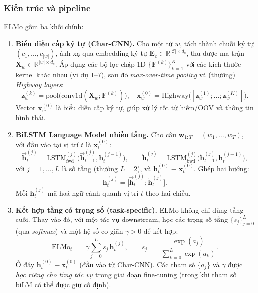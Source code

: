 \subsubsection{Kiến trúc và pipeline}
\label{ssec:elmo_architecture}

ELMo gồm ba khối chính:

\begin{enumerate}
  \item \textbf{Biểu diễn cấp ký tự (Char-CNN).}
  Cho một từ $w$, tách thành chuỗi ký tự $(c_1,\dots,c_{|w|})$, ánh xạ qua embedding ký tự $\mathbf{E}_c \in \mathbb{R}^{|\mathcal{C}|\times d_c}$, thu được ma trận $\mathbf{X}_w \in \mathbb{R}^{|w|\times d_c}$. Áp dụng các bộ lọc chập 1D $\{\mathbf{F}^{(k)}\}_{k=1}^K$ với các kích thước kernel khác nhau (ví dụ 1–7), sau đó \emph{max-over-time pooling} và (thường) \emph{Highway layers}:
  \[
    \mathbf{z}_w^{(k)} = \mathrm{pool}\big(\mathrm{conv1d}(\mathbf{X}_w; \mathbf{F}^{(k)})\big), 
    \quad
    \mathbf{x}_w^{(0)} = \mathrm{Highway}\big([\mathbf{z}_w^{(1)};\dots;\mathbf{z}_w^{(K)}]\big).
  \]
  Vector $\mathbf{x}_w^{(0)}$ là biểu diễn cấp ký tự, giúp xử lý tốt từ hiếm/OOV và thông tin hình thái.

  \item \textbf{BiLSTM Language Model nhiều tầng.}
  Cho câu $\mathbf{w}_{1:T} = (w_1,\dots,w_T)$, với đầu vào tại vị trí $t$ là $\mathbf{x}_t^{(0)}$:
  \[
    \overrightarrow{\mathbf{h}}_{t}^{(j)} = \mathrm{LSTM}^{(j)}_{\mathrm{fwd}}\big(\overrightarrow{\mathbf{h}}_{t-1}^{(j)}, \mathbf{h}_{t}^{(j-1)}\big), 
    \qquad
    \overleftarrow{\mathbf{h}}_{t}^{(j)} = \mathrm{LSTM}^{(j)}_{\mathrm{bwd}}\big(\overleftarrow{\mathbf{h}}_{t+1}^{(j)}, \mathbf{h}_{t}^{(j-1)}\big),
  \]
  với $j=1,\dots,L$ là số tầng (thường $L=2$), và $\mathbf{h}_t^{(0)}\equiv \mathbf{x}_t^{(0)}$. Ghép hai hướng:
  \[
    \mathbf{h}_t^{(j)} = \big[\overrightarrow{\mathbf{h}}_{t}^{(j)} ; \overleftarrow{\mathbf{h}}_{t}^{(j)}\big].
  \]
  Mỗi $\mathbf{h}_t^{(j)}$ mã hoá ngữ cảnh quanh vị trí $t$ theo hai chiều.

  \item \textbf{Kết hợp tầng có trọng số (task-specific).}
  ELMo không chỉ dùng tầng cuối. Thay vào đó, với một tác vụ downstream, học các trọng số tầng $\{s_j\}_{j=0}^{L}$ (qua \emph{softmax}) và một hệ số co giãn $\gamma>0$ để kết hợp:
  \[
    \text{ELMo}_t \;=\; \gamma \sum_{j=0}^{L} s_j\, \mathbf{h}_t^{(j)}, 
    \qquad 
    s_j \;=\; \frac{\exp(a_j)}{\sum_{k=0}^{L}\exp(a_k)}.
  \]
  Ở đây $\mathbf{h}_t^{(0)}\equiv \mathbf{x}_t^{(0)}$ (đầu vào từ Char-CNN). Các tham số $\{a_j\}$ và $\gamma$ được \emph{học riêng cho từng tác vụ} trong giai đoạn fine-tuning (trong khi tham số biLM có thể được giữ cố định).
\end{enumerate}

